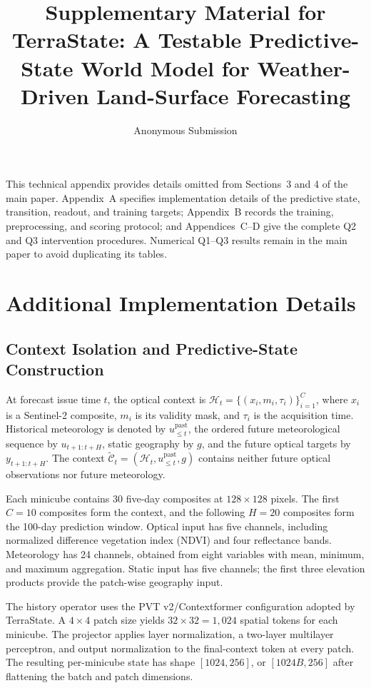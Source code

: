 \documentclass[letterpaper]{article}
\title{Supplementary Material for TerraState: A Testable Predictive-State World Model for Weather-Driven Land-Surface Forecasting}
\author{Anonymous Submission}
\begin{document}
\maketitle

This technical appendix provides details omitted from Sections~3 and 4 of the
main paper. Appendix~A specifies implementation details of the predictive
state, transition, readout, and training targets; Appendix~B records the
training, preprocessing, and scoring protocol; and Appendices~C--D give the
complete Q2 and Q3 intervention procedures. Numerical Q1--Q3 results remain
in the main paper to avoid duplicating its tables.

\appendix

\section{Additional Implementation Details}
\label{sec:method-details}

\subsection{Context Isolation and Predictive-State Construction}

At forecast issue time \(t\), the optical context is
\(\mathcal H_t=\{(x_i,m_i,\tau_i)\}_{i=1}^{C}\), where \(x_i\) is a
Sentinel-2 composite, \(m_i\) is its validity mask, and \(\tau_i\) is the
acquisition time. Historical meteorology is denoted by
\(u_{\leq t}^{\mathrm{past}}\), the ordered future meteorological sequence by
\(u_{t+1:t+H}\), static geography by \(g\), and the future optical targets by
\(y_{t+1:t+H}\). The context
\(\widetilde{\mathcal C}_t=(\mathcal H_t,u_{\leq t}^{\mathrm{past}},g)\)
contains neither future optical observations nor future meteorology.

Each minicube contains 30 five-day composites at \(128\times128\) pixels. The
first \(C=10\) composites form the context, and the following \(H=20\)
composites form the 100-day prediction window. Optical input has five
channels, including normalized difference vegetation index (NDVI) and four
reflectance bands. Meteorology has 24 channels, obtained from eight variables
with mean, minimum, and maximum aggregation. Static input has five channels;
the first three elevation products provide the patch-wise geography input.

The history operator uses the PVT v2/Contextformer configuration adopted by
TerraState. A \(4\times4\) patch size yields \(32\times32=1{,}024\)
spatial tokens for each minicube. The projector applies layer normalization,
a two-layer multilayer perceptron, and output normalization to the
final-context token at every patch. The resulting per-minicube state has shape
\([1024,256]\), or \([1024B,256]\) after flattening the batch and patch
dimensions.
\end{document}
